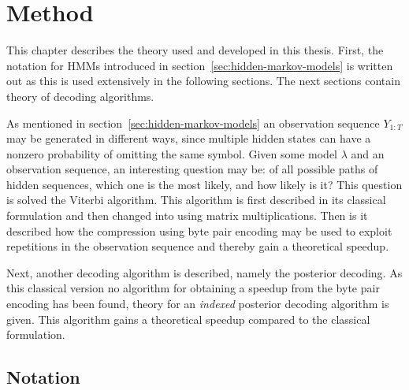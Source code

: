 \chapter{Method}
\label{cha:method}

This chapter describes the theory used and developed in this thesis. First, the
notation for HMMs introduced in section~\ref{sec:hidden-markov-models} is
written out as this is used extensively in the following sections. The next
sections contain theory of decoding algorithms.

As mentioned in section~\ref{sec:hidden-markov-models} an observation sequence
$Y_{1:T}$ may be generated in different ways, since multiple hidden states can
have a nonzero probability of omitting the same symbol. Given some model
$\lambda$ and an observation sequence, an interesting question may be: of all
possible paths of hidden sequences, which one is the most likely, and how likely
is it? This question is solved the Viterbi algorithm. This algorithm is first
described in its classical formulation and then changed into using matrix
multiplications. Then is it described how the compression using byte pair
encoding may be used to exploit repetitions in the observation sequence and
thereby gain a theoretical speedup.

Next, another decoding algorithm is described, namely the posterior decoding.
As this classical version no algorithm for obtaining a speedup from the byte
pair encoding has been found, theory for an \emph{indexed} posterior decoding
algorithm is given. This algorithm gains a theoretical speedup compared to the
classical formulation.

\section{Notation}

